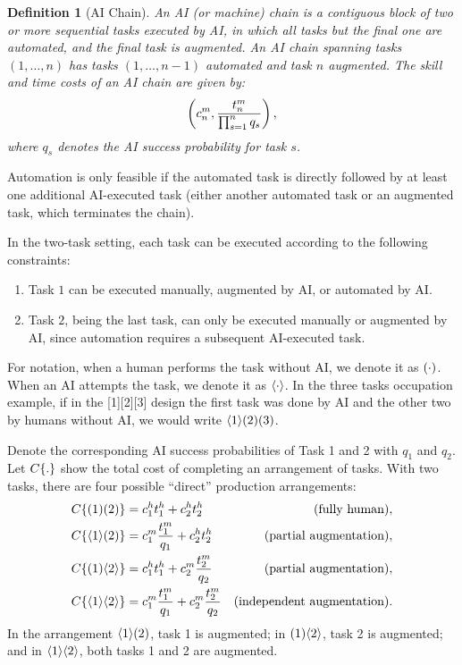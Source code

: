 \documentclass{article}
\theoremstyle{plain}
\theoremstyle{plain}
\newtheorem{definition}[theorem]{Definition}
\begin{document}
\begin{definition}[AI Chain]
\label{def:ai_chain}
An AI (or machine) chain is a contiguous block of two or more sequential tasks executed by AI, in which all tasks but the final one are automated, and the final task is augmented.
An AI chain spanning tasks $(1,\dots,n)$ has tasks $(1,\dots,n-1)$ automated and task $n$ augmented.
The skill and time costs of an AI chain are given by:
\[
\left(c^{m}_{n}, \frac{t^{m}_{n}}{\prod_{s=1}^{n} q_s}\right),
\]
where $q_s$ denotes the AI success probability for task $s$.
\end{definition}
Automation is only feasible if the automated task is directly followed by at least one additional AI-executed task (either another automated task or an augmented task, which terminates the chain).

In the two-task setting, each task can be executed according to the following constraints:
\begin{enumerate}
\item Task $1$ can be executed manually, augmented by AI, or automated by AI.
\item Task $2$, being the last task, can only be executed manually or augmented by AI, since automation requires a subsequent AI-executed task.
\end{enumerate}

For notation, when a human performs the task without AI, we denote it as $( \cdot )$.
When an AI attempts the task, we denote it as $\langle \cdot \rangle$.
In the three tasks occupation example, if in the [1][2][3] design the first task was done by AI and the other two by humans without AI, we would write $\langle 1 \rangle( 2 )( 3 )$.

Denote the corresponding AI success probabilities of Task 1 and 2 with \(q_1\) and \(q_2\). 
Let $C\{ . \}$ show the total cost of completing an arrangement of tasks.
With two tasks, there are four possible ``direct'' production arrangements:
\begin{align*}
    C\{ ( 1 )( 2 ) \} &= c^{h}_{1} t^{h}_{1} + c^{h}_{2} t^{h}_{2} & \text{(fully human)}, \\
    C\{ \langle 1 \rangle( 2 ) \} &= c^{m}_{1} \frac{t^{m}_{1}}{q_1} + c^{h}_{2} t^{h}_{2} & \text{(partial augmentation)}, \\
    C\{ ( 1 )\langle 2 \rangle \} &= c^{h}_{1} t^{h}_{1} + c^{m}_{2} \frac{t^{m}_{2}}{q_2} & \text{(partial augmentation)}, \\
    C\{ \langle 1 \rangle\langle 2 \rangle \} &= c^{m}_{1} \frac{t^{m}_{1}}{q_1} + c^{m}_{2} \frac{t^{m}_{2}}{q_2} & \text{(independent augmentation)}.
\end{align*}
In the arrangement $\langle 1 \rangle( 2 )$, task 1 is augmented; in $( 1 )\langle 2 \rangle$, task 2 is augmented; and in $\langle 1 \rangle\langle 2 \rangle$, both tasks 1 and 2 are augmented.  
\end{document}
